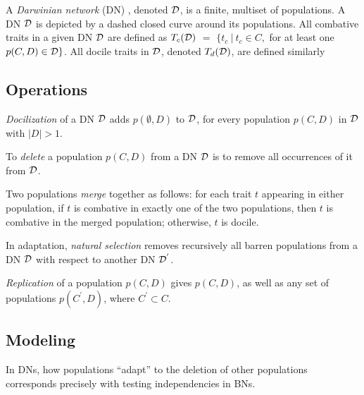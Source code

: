 
		A \emph{Darwinian network} (DN) , denoted $\cal{D}$, is a finite, multiset of populations.
		A DN $\cal{D}$ is depicted by a dashed closed curve around its populations.
		All combative traits in a given DN $\cal{D}$ are defined as $T_c(\cal{D})$ $=$ $\{t_{c} ~ | ~ t_{c} \in C,$ for at least one $p(C,D) \in \cal{D}\}$.
		All docile traits in $\cal{D}$, denoted $T_d(\cal{D})$, are defined similarly


\subsection{Operations}
\label{subsec:operations}



		
		\emph{Docilization} of a DN $\cal{D}$ adds $p(\emptyset,D)$ to $\cal D$, for every population $p(C,D)$ in ${\cal D}$ with $|D| > 1$.
		

		
		To \emph{delete} a population $p(C,D)$ from a DN $\cal{D}$ is to remove all occurrences of it from $\cal{D}$.
		

		
		Two populations \emph{merge} together as follows: for each trait $t$ appearing in either population, if $t$ is combative in exactly one of the two populations, then $t$ is combative in the merged population; otherwise, $t$ is docile.
		

		
		In adaptation, \emph{natural selection} removes recursively all barren populations from a DN $\cal{D}$ with respect to another DN ${\cal{D}}^{'}$.
		

		
		\emph{Replication} of a population $p(C,D)$ gives $p(C,D)$, as well as any set of populations $p(C^{'}, D)$, where $C^{'} \subset C$.
		

\subsection{Modeling}
\label{subsec:adaptation}


In DNs, how populations ``adapt'' to the deletion of other populations corresponds precisely with testing independencies in BNs.

